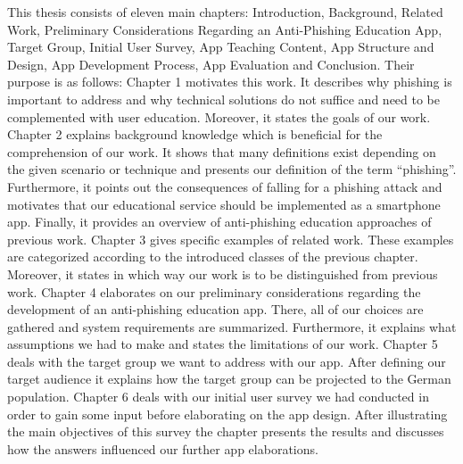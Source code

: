 This thesis consists of eleven main chapters: Introduction, Background, Related Work, Preliminary Considerations Regarding an Anti-Phishing Education App, Target Group, Initial User Survey, App Teaching Content, App Structure and Design, App Development Process, App Evaluation and Conclusion. Their purpose is as follows:
\newline
\newline
Chapter 1 motivates this work. It describes why phishing is important to address and why technical solutions do not suffice and need to be complemented with user education. Moreover, it states the goals of our work.
\newline
\newline
Chapter 2 explains background knowledge which is beneficial for the comprehension of our work. 
It shows that many definitions exist depending on the given scenario or technique and presents our definition of the term ``phishing''. Furthermore, it points out the consequences of falling for a phishing attack and motivates that our educational service should be implemented as a smartphone app.
Finally, it provides an overview of anti-phishing education approaches of previous work.
\newline
\newline
Chapter 3 gives specific examples of related work. These examples are categorized according to the introduced classes of the previous chapter. Moreover, it states in which way our work is to be distinguished from previous work. 
\newline
\newline
Chapter 4 elaborates on our preliminary considerations regarding the development of an anti-phishing education app. 
There, all of our choices are gathered and system requirements are summarized.
Furthermore, it explains what assumptions we had to make and states the limitations of our work.
\newline
\newline
Chapter 5 deals with the target group we want to address with our app.
After defining our target audience it explains how the target group can be projected to the German population.
\newline
\newline
Chapter 6 deals with our initial user survey we had conducted in order to gain some input before elaborating on the app design. After illustrating the main objectives of this survey the chapter presents the results and discusses how the answers influenced our further app elaborations.
